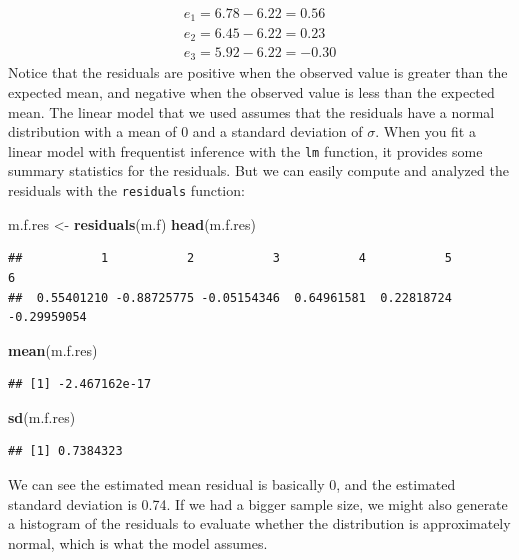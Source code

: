 \documentclass[
]{book}
\newenvironment{Shaded}{\begin{snugshade}}{\end{snugshade}}
\newcommand{\FunctionTok}[1]{\textcolor[rgb]{0.13,0.29,0.53}{\textbf{#1}}}
\newcommand{\NormalTok}[1]{#1}
\newcommand{\OtherTok}[1]{\textcolor[rgb]{0.56,0.35,0.01}{#1}}
\begin{document}
\[
\begin{array}{l}
e_1 = 6.78 - 6.22 = 0.56 \\
e_2 = 6.45 - 6.22 = 0.23 \\
e_3 = 5.92 - 6.22 = -0.30 
\end{array}
\]
Notice that the residuals are positive when the observed value is greater than the expected mean, and negative when the observed value is less than the expected mean. The linear model that we used assumes that the residuals have a normal distribution with a mean of 0 and a standard deviation of \(\sigma\). When you fit a linear model with frequentist inference with the \texttt{lm} function, it provides some summary statistics for the residuals. But we can easily compute and analyzed the residuals with the \texttt{residuals} function:

\begin{Shaded}
\begin{Highlighting}[]
\NormalTok{m.f.res }\OtherTok{\textless{}{-}} \FunctionTok{residuals}\NormalTok{(m.f)}
\FunctionTok{head}\NormalTok{(m.f.res)}
\end{Highlighting}
\end{Shaded}

\begin{verbatim}
##           1           2           3           4           5           6 
##  0.55401210 -0.88725775 -0.05154346  0.64961581  0.22818724 -0.29959054
\end{verbatim}

\begin{Shaded}
\begin{Highlighting}[]
\FunctionTok{mean}\NormalTok{(m.f.res)}
\end{Highlighting}
\end{Shaded}

\begin{verbatim}
## [1] -2.467162e-17
\end{verbatim}

\begin{Shaded}
\begin{Highlighting}[]
\FunctionTok{sd}\NormalTok{(m.f.res)}
\end{Highlighting}
\end{Shaded}

\begin{verbatim}
## [1] 0.7384323
\end{verbatim}

We can see the estimated mean residual is basically 0, and the estimated standard deviation is 0.74. If we had a bigger sample size, we might also generate a histogram of the residuals to evaluate whether the distribution is approximately normal, which is what the model assumes.
\end{document}
